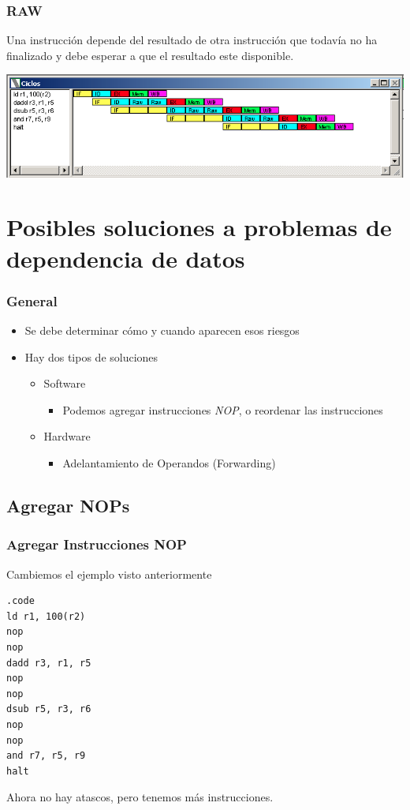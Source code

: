 \documentclass{beamer}
\begin{document}
\begin{frame}[fragile]
\frametitle{RAW}
Una instrucción depende del resultado de otra instrucción que todavía no ha finalizado y debe esperar a que el resultado este disponible.
\begin{block}{}
\includegraphics[scale=0.45]{raw.png}
\end{block}

\end{frame}



\section{Posibles soluciones a problemas de dependencia de datos}
\begin{frame}
\frametitle{General}
\begin{itemize}
\item Se debe determinar cómo y cuando aparecen esos riesgos
\item Hay dos tipos de soluciones
\begin{itemize}
\item Software
\begin{itemize}
\item Podemos agregar instrucciones \emph{NOP}, o reordenar las instrucciones
\end{itemize}
\item Hardware
\begin{itemize}
\item Adelantamiento de Operandos (Forwarding)
\end{itemize}
\end{itemize}
\end{itemize}
\end{frame}

\subsection{Agregar NOPs}
\begin{frame}[fragile]
\frametitle{Agregar Instrucciones NOP}

Cambiemos el ejemplo visto anteriormente
\begin{block}{}
\begin{lstlisting}[basicstyle=\ttfamily,keywordstyle=\color{blue}]
.code
ld r1, 100(r2)
nop
nop
dadd r3, r1, r5
nop
nop
dsub r5, r3, r6
nop
nop
and r7, r5, r9
halt
\end{lstlisting}
\end{block}
Ahora no hay atascos, pero tenemos más instrucciones.
\end{frame}
\end{document}
